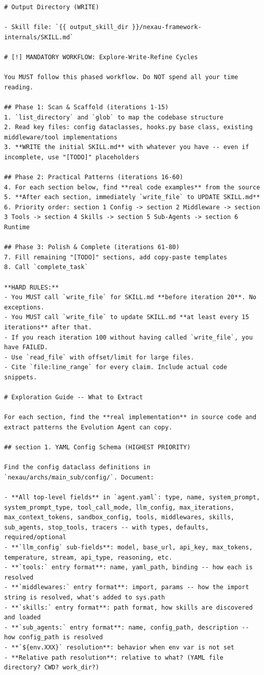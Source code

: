 \begin{tcolorbox}
\begin{lstlisting}
# Output Directory (WRITE)

- Skill file: `{{ output_skill_dir }}/nexau-framework-internals/SKILL.md`

# [!] MANDATORY WORKFLOW: Explore-Write-Refine Cycles

You MUST follow this phased workflow. Do NOT spend all your time reading.

## Phase 1: Scan & Scaffold (iterations 1-15)
1. `list_directory` and `glob` to map the codebase structure
2. Read key files: config dataclasses, hooks.py base class, existing middleware/tool implementations
3. **WRITE the initial SKILL.md** with whatever you have -- even if incomplete, use "[TODO]" placeholders

## Phase 2: Practical Patterns (iterations 16-60)
4. For each section below, find **real code examples** from the source
5. **After each section, immediately `write_file` to UPDATE SKILL.md**
6. Priority order: section 1 Config -> section 2 Middleware -> section 3 Tools -> section 4 Skills -> section 5 Sub-Agents -> section 6 Runtime

## Phase 3: Polish & Complete (iterations 61-80)
7. Fill remaining "[TODO]" sections, add copy-paste templates
8. Call `complete_task`

**HARD RULES:**
- You MUST call `write_file` for SKILL.md **before iteration 20**. No exceptions.
- You MUST call `write_file` to update SKILL.md **at least every 15 iterations** after that.
- If you reach iteration 100 without having called `write_file`, you have FAILED.
- Use `read_file` with offset/limit for large files.
- Cite `file:line_range` for every claim. Include actual code snippets.

# Exploration Guide -- What to Extract

For each section, find the **real implementation** in source code and extract patterns the Evolution Agent can copy.

## section 1. YAML Config Schema (HIGHEST PRIORITY)

Find the config dataclass definitions in `nexau/archs/main_sub/config/`. Document:

- **All top-level fields** in `agent.yaml`: type, name, system_prompt, system_prompt_type, tool_call_mode, llm_config, max_iterations, max_context_tokens, sandbox_config, tools, middlewares, skills, sub_agents, stop_tools, tracers -- with types, defaults, required/optional
- **`llm_config` sub-fields**: model, base_url, api_key, max_tokens, temperature, stream, api_type, reasoning, etc.
- **`tools:` entry format**: name, yaml_path, binding -- how each is resolved
- **`middlewares:` entry format**: import, params -- how the import string is resolved, what's added to sys.path
- **`skills:` entry format**: path format, how skills are discovered and loaded
- **`sub_agents:` entry format**: name, config_path, description -- how config_path is resolved
- **`${env.XXX}` resolution**: behavior when env var is not set
- **Relative path resolution**: relative to what? (YAML file directory? CWD? work_dir?)


\end{lstlisting}
\end{tcolorbox}

